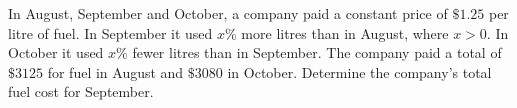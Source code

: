 In August, September and October, a company paid a constant price of $\$1.25$ per litre of fuel. In September it used $x\%$ more litres than in August, where $x>0$. In October it used $x\%$ fewer litres than in September. The company paid a total of $\$3125$ for fuel in August and $\$3080$ in October. Determine the company's total fuel cost for September.
